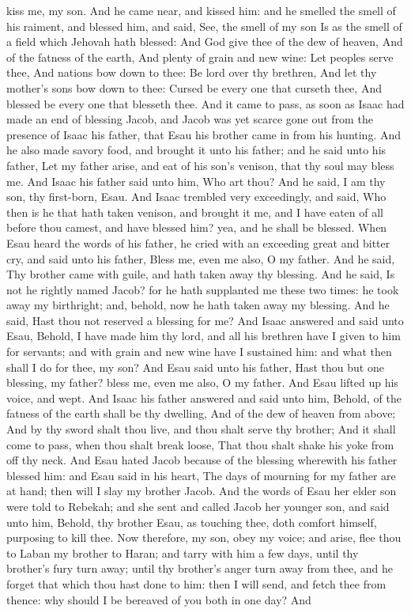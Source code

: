 kiss me, my son. And he came near, and kissed him: and he smelled the smell of his raiment, and blessed him, and said, See, the smell of my son Is as the smell of a field which Jehovah hath blessed:  And God give thee of the dew of heaven, And of the fatness of the earth, And plenty of grain and new wine:  Let peoples serve thee, And nations bow down to thee: Be lord over thy brethren, And let thy mother’s sons bow down to thee: Cursed be every one that curseth thee, And blessed be every one that blesseth thee.  And it came to pass, as soon as Isaac had made an end of blessing Jacob, and Jacob was yet scarce gone out from the presence of Isaac his father, that Esau his brother came in from his hunting. And he also made savory food, and brought it unto his father; and he said unto his father, Let my father arise, and eat of his son’s venison, that thy soul may bless me. And Isaac his father said unto him, Who art thou? And he said, I am thy son, thy first-born, Esau. And Isaac trembled very exceedingly, and said, Who then is he that hath taken venison, and brought it me, and I have eaten of all before thou camest, and have blessed him? yea, and he shall be blessed. When Esau heard the words of his father, he cried with an exceeding great and bitter cry, and said unto his father, Bless me, even me also, O my father. And he said, Thy brother came with guile, and hath taken away thy blessing. And he said, Is not he rightly named Jacob? for he hath supplanted me these two times: he took away my birthright; and, behold, now he hath taken away my blessing. And he said, Hast thou not reserved a blessing for me? And Isaac answered and said unto Esau, Behold, I have made him thy lord, and all his brethren have I given to him for servants; and with grain and new wine have I sustained him: and what then shall I do for thee, my son? And Esau said unto his father, Hast thou but one blessing, my father? bless me, even me also, O my father. And Esau lifted up his voice, and wept. And Isaac his father answered and said unto him, Behold, of the fatness of the earth shall be thy dwelling, And of the dew of heaven from above;  And by thy sword shalt thou live, and thou shalt serve thy brother; And it shall come to pass, when thou shalt break loose, That thou shalt shake his yoke from off thy neck.  And Esau hated Jacob because of the blessing wherewith his father blessed him: and Esau said in his heart, The days of mourning for my father are at hand; then will I slay my brother Jacob. And the words of Esau her elder son were told to Rebekah; and she sent and called Jacob her younger son, and said unto him, Behold, thy brother Esau, as touching thee, doth comfort himself, purposing to kill thee. Now therefore, my son, obey my voice; and arise, flee thou to Laban my brother to Haran; and tarry with him a few days, until thy brother’s fury turn away; until thy brother’s anger turn away from thee, and he forget that which thou hast done to him: then I will send, and fetch thee from thence: why should I be bereaved of you both in one day?  And 